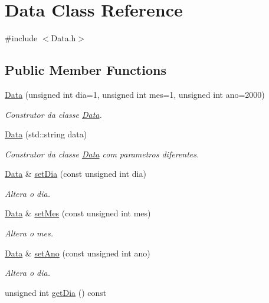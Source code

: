 \hypertarget{classData}{}\section{Data Class Reference}
\label{classData}


{\ttfamily \#include $<$Data.\+h$>$}

\subsection*{Public Member Functions}
\begin{DoxyCompactItemize}
\item 
\hyperlink{classData_aef12795194c8980d7e9f563f3d9d6c8e}{Data} (unsigned int dia=1, unsigned int mes=1, unsigned int ano=2000)
\begin{DoxyCompactList}\small\item\em Construtor da classe \hyperlink{classData}{Data}. \end{DoxyCompactList}\item 
\hyperlink{classData_a972911ca68256147a714d91bba1e4da2}{Data} (std\+::string data)
\begin{DoxyCompactList}\small\item\em Construtor da classe \hyperlink{classData}{Data} com parametros diferentes. \end{DoxyCompactList}\item 
\hyperlink{classData}{Data} \& \hyperlink{classData_a3e2c5356bc8d548b75c7d085f7a7c4ee}{set\+Dia} (const unsigned int dia)
\begin{DoxyCompactList}\small\item\em Altera o dia. \end{DoxyCompactList}\item 
\hyperlink{classData}{Data} \& \hyperlink{classData_ab15051ae481d89d057b22abc8152584c}{set\+Mes} (const unsigned int mes)
\begin{DoxyCompactList}\small\item\em Altera o mes. \end{DoxyCompactList}\item 
\hyperlink{classData}{Data} \& \hyperlink{classData_a8d4cfad647b590df436d8260000a2745}{set\+Ano} (const unsigned int ano)
\begin{DoxyCompactList}\small\item\em Altera o dia. \end{DoxyCompactList}\item 
unsigned int \hyperlink{classData_a459536c9351759b5697ba25456d9bd70}{get\+Dia} () const

\end{DoxyCompactItemize}
